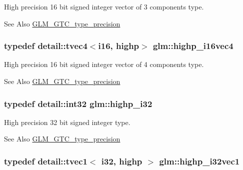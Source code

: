 High precision 16 bit signed integer vector of 3 components type. \begin{DoxySeeAlso}{See Also}
\hyperlink{group__gtc__type__precision}{G\-L\-M\-\_\-\-G\-T\-C\-\_\-type\-\_\-precision} 
\end{DoxySeeAlso}
\hypertarget{group__gtc__type__precision_ga7fd6f1b3c224833cc330a2c64b6994dd}{
\subsubsection[{highp\-\_\-i16vec4}]{\setlength{\rightskip}{0pt plus 5cm}typedef detail\-::tvec4$<$i16, highp$>$ {\bf glm\-::highp\-\_\-i16vec4}}}\label{group__gtc__type__precision_ga7fd6f1b3c224833cc330a2c64b6994dd}
High precision 16 bit signed integer vector of 4 components type. \begin{DoxySeeAlso}{See Also}
\hyperlink{group__gtc__type__precision}{G\-L\-M\-\_\-\-G\-T\-C\-\_\-type\-\_\-precision} 
\end{DoxySeeAlso}
\hypertarget{group__gtc__type__precision_ga197d19b585222da57d70238a5cfc2be8}{
\subsubsection[{highp\-\_\-i32}]{\setlength{\rightskip}{0pt plus 5cm}typedef detail\-::int32 {\bf glm\-::highp\-\_\-i32}}}\label{group__gtc__type__precision_ga197d19b585222da57d70238a5cfc2be8}
High precision 32 bit signed integer type. \begin{DoxySeeAlso}{See Also}
\hyperlink{group__gtc__type__precision}{G\-L\-M\-\_\-\-G\-T\-C\-\_\-type\-\_\-precision} 
\end{DoxySeeAlso}
\hypertarget{group__gtc__type__precision_gadcd58130a48fa561e784a135a88c5d6e}{
\subsubsection[{highp\-\_\-i32vec1}]{\setlength{\rightskip}{0pt plus 5cm}typedef detail\-::tvec1$<$ i32, highp $>$ {\bf glm\-::highp\-\_\-i32vec1}}}\label{group__gtc__type__precision_gadcd58130a48fa561e784a135a88c5d6e}
